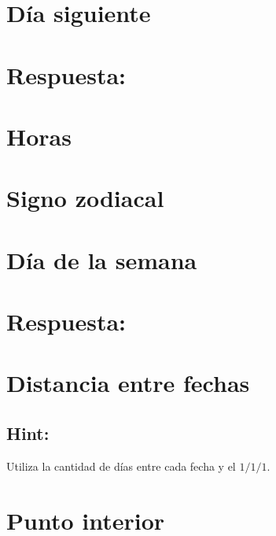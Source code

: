 \section{Día siguiente}

\ifshowanswers
\section*{Respuesta:}

\fi

\section{Horas}


\section{Signo zodiacal}


\section{Día de la semana}

\ifshowanswers
\section*{Respuesta:}

\fi

\section{Distancia entre fechas}

\ifshowanswers
\subsection*{Hint:} 
Utiliza la cantidad de días entre cada fecha y el $1/1/1$.
\fi

\section{Punto interior}
